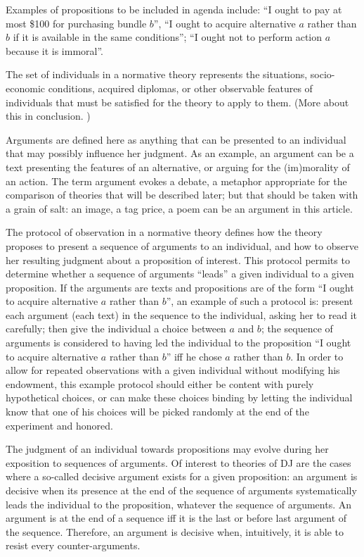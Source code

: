 \documentclass[version=last, pagesize, twoside=off, bibliography=totoc, DIV=calc, fontsize=12pt, a4paper, french, english]{scrartcl}
\begin{document}
Examples of propositions to be included in agenda include: “I ought to pay at most \$100 for purchasing bundle $b$”, “I ought to acquire alternative $a$ rather than $b$ if it is available in the same conditions”; “I ought not to perform action $a$ because it is immoral”.

The set of individuals in a normative theory represents the situations, socio-economic conditions, acquired diplomas, or other observable features of individuals that must be satisfied for the theory to apply to them. (More about this in conclusion. \TODO{})

Arguments are defined here as anything that can be presented to an individual that may possibly influence her judgment. As an example, an argument can be a text presenting the features of an alternative, or arguing for the (im)morality of an action. The term argument evokes a debate, a metaphor appropriate for the comparison of theories that will be described later; but that should be taken with a grain of salt: an image, a tag price, a poem can be an argument in this article. 

The protocol of observation in a normative theory defines how the theory proposes to present a sequence of arguments to an individual, and how to observe her resulting judgment about a proposition of interest. This protocol permits to determine whether a sequence of arguments “leads” a given individual to a given proposition. If the arguments are texts and propositions are of the form “I ought to acquire alternative $a$ rather than $b$”, an example of such a protocol is: present each argument (each text) in the sequence to the individual, asking her to read it carefully; then give the individual a choice between $a$ and $b$; the sequence of arguments is considered to having led the individual to the proposition “I ought to acquire alternative $a$ rather than $b$” iff he chose $a$ rather than $b$.
In order to allow for repeated observations with a given individual without modifying his endowment, this example protocol should either be content with purely hypothetical choices, or can make these choices binding by letting the individual know that one of his choices will be picked randomly at the end of the experiment and honored.

The judgment of an individual towards propositions may evolve during her exposition to sequences of arguments. Of interest to theories of \ac{DJ} are the cases where a so-called decisive argument exists for a given proposition: an argument is decisive when its presence at the end of the sequence of arguments systematically leads the individual to the proposition, whatever the sequence of arguments. An argument is at the end of a sequence iff it is the last or before last argument of the sequence. Therefore, an argument is decisive when, intuitively, it is able to resist every counter-arguments. 
\end{document}

